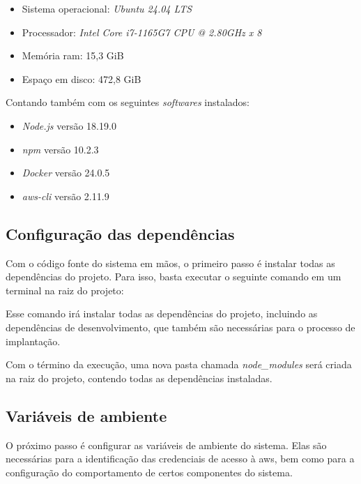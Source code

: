 \begin{itemize}
    \item Sistema operacional: \textit{Ubuntu 24.04 LTS}
    \item Processador: \textit{Intel Core i7-1165G7 CPU @ 2.80GHz x 8}
    \item Memória \gls{ram}: 15,3 GiB 
    \item Espaço em disco: 472,8 GiB
\end{itemize}

Contando também com os seguintes \textit{softwares} instalados:

\begin{itemize}
    \item \textit{Node.js} versão 18.19.0
    \item \textit{npm} versão 10.2.3
    \item \textit{Docker} versão 24.0.5
    \item \textit{aws-cli} versão 2.11.9
\end{itemize}

\subsection{Configuração das dependências}
\label{subsec:configuracaoDasDependencias}

Com o código fonte do sistema em mãos, o primeiro passo é instalar todas as dependências do projeto. Para isso, basta executar o seguinte comando em um terminal na raiz do projeto:


Esse comando irá instalar todas as dependências do projeto, incluindo as dependências de desenvolvimento, que também são necessárias para o processo de implantação.

Com o término da execução, uma nova pasta chamada \textit{node\_modules} será criada na raiz do projeto, contendo todas as dependências instaladas.

\subsection{Variáveis de ambiente}
\label{subsec:variaveisDeAmbienteEFeatureFlags}

O próximo passo é configurar as variáveis de ambiente do sistema. Elas são necessárias para a identificação das credenciais de acesso à \gls{aws}, bem como para a configuração do comportamento de certos componentes do sistema.


